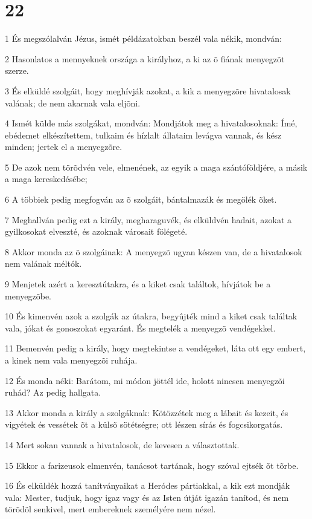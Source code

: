 \chapter{22}

\par 1 És megszólalván Jézus, ismét példázatokban beszél vala nékik, mondván:
\par 2 Hasonlatos a mennyeknek országa a királyhoz, a ki az õ fiának menyegzõt szerze.
\par 3 És elküldé szolgáit, hogy meghívják azokat, a kik a menyegzõre hivatalosak valának; de nem akarnak vala eljõni.
\par 4 Ismét külde más szolgákat, mondván: Mondjátok meg a hivatalosoknak: Ímé, ebédemet elkészítettem, tulkaim és hízlalt állataim levágva vannak, és kész minden; jertek el a menyegzõre.
\par 5 De azok nem törõdvén vele, elmenének, az egyik a maga szántóföldjére, a másik a maga kereskedésébe;
\par 6 A többiek pedig megfogván az õ szolgáit, bántalmazák és megölék õket.
\par 7 Meghallván pedig ezt a király, megharaguvék, és elküldvén hadait, azokat a gyilkosokat elveszté, és azoknak városait fölégeté.
\par 8 Akkor monda az õ szolgáinak: A menyegzõ ugyan készen van, de a hivatalosok nem valának méltók.
\par 9 Menjetek azért a keresztútakra, és a kiket csak találtok, hívjátok be a menyegzõbe.
\par 10 És kimenvén azok a szolgák az útakra, begyûjték mind a kiket csak találtak vala, jókat és gonoszokat egyaránt. És megtelék a menyegzõ vendégekkel.
\par 11 Bemenvén pedig a király, hogy megtekintse a vendégeket, láta ott egy embert, a kinek nem vala menyegzõi ruhája.
\par 12 És monda néki: Barátom, mi módon jöttél ide, holott nincsen menyegzõi ruhád? Az pedig hallgata.
\par 13 Akkor monda a király a szolgáknak: Kötözzétek meg a lábait és kezeit, és vigyétek és vessétek õt a külsõ sötétségre; ott lészen sírás és fogcsikorgatás.
\par 14 Mert sokan vannak a hivatalosok, de kevesen a választottak.
\par 15 Ekkor a farizeusok elmenvén, tanácsot tartának, hogy szóval ejtsék õt tõrbe.
\par 16 És elküldék hozzá tanítványaikat a Heródes pártiakkal, a kik ezt mondják vala: Mester, tudjuk, hogy igaz vagy és az Isten útját igazán tanítod, és nem törõdöl senkivel, mert embereknek személyére nem nézel.
